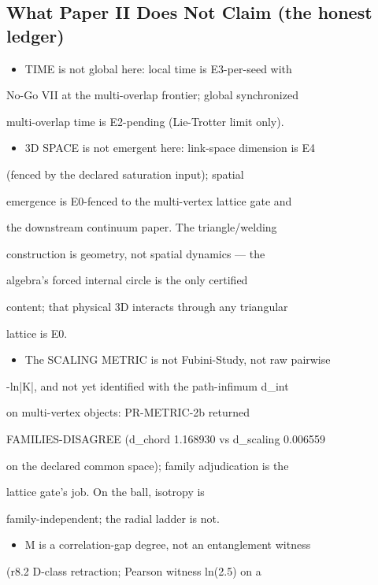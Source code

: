 \documentclass[11pt,a4paper]{article}
\theoremstyle{definition}
\begin{document}
\subsection{What Paper II Does Not Claim (the honest ledger)}

\begin{itemize}[leftmargin=1.4em]
\item TIME is not global here: local time is E3-per-seed with
\end{itemize}
    No-Go VII at the multi-overlap frontier; global synchronized

    multi-overlap time is E2-pending (Lie-Trotter limit only).

\begin{itemize}[leftmargin=1.4em]
\item 3D SPACE is not emergent here: link-space dimension is E4
\end{itemize}
    (fenced by the declared saturation input); spatial

    emergence is E0-fenced to the multi-vertex lattice gate and

    the downstream continuum paper. The triangle/welding

    construction is geometry, not spatial dynamics — the

    algebra's forced internal circle is the only certified

    content; that physical 3D interacts through any triangular

    lattice is E0.

\begin{itemize}[leftmargin=1.4em]
\item The SCALING METRIC is not Fubini-Study, not raw pairwise
\end{itemize}
    -ln|K|, and not yet identified with the path-infimum d\_int

    on multi-vertex objects: PR-METRIC-2b returned

    FAMILIES-DISAGREE (d\_chord 1.168930 vs d\_scaling 0.006559

    on the declared common space); family adjudication is the

    lattice gate's job. On the ball, isotropy is

    family-independent; the radial ladder is not.

\begin{itemize}[leftmargin=1.4em]
\item M is a correlation-gap degree, not an entanglement witness
\end{itemize}
    (r8.2 D-class retraction; Pearson witness ln(2.5) on a
\end{document}
